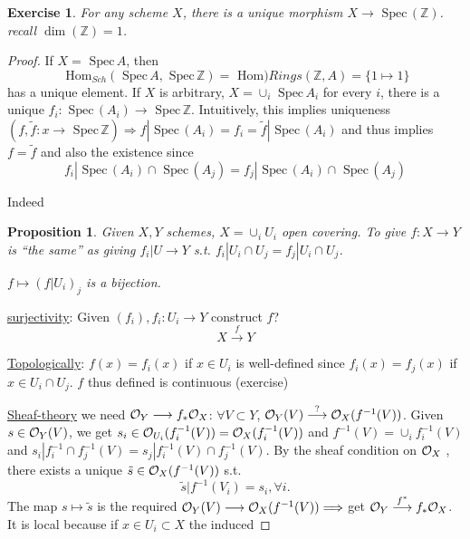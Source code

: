 \documentclass[11pt]{article}
\newtheorem{prop}[thm]{Proposition}
\newtheorem{exercise}[thm]{Exercise}
\renewcommand{\hom}{\text{ Hom}}
\newcommand{\spec}{\text{ Spec}\,}
\newcommand{\intg}{\mathbb Z}
\newcommand{\calo}{{\cal O}}
\newcommand{\Lrta}{\Longrightarrow}
\newcommand{\lrta}{\longrightarrow}
\begin{document}
\begin{exercise}
For any scheme $X$, there is a unique morphism $X\lrta \spec(\intg)$. recall $\dim(\intg)=1$.
\end{exercise}
\begin{proof}
If $X=\spec A$, then
$$
\hom_{Sch}(\spec A,\spec \intg)=\hom){Rings}(\intg, A)=\{1\mapsto 1\}
$$
has a unique element. If $X$ is arbitrary, $X=\cup_{i}\spec A_i$ for every $i$, there is a unique $f_i:\spec (A_i)\lrta \spec \intg$. Intuitively, this implies uniqueness $(f,\tilde{f}:x\lrta \spec \intg)\Lrta f|\spec(A_i)=f_i=\tilde{f}|\spec(A_i)$ and thus implies $f=\tilde{f}$ and also the existence since
$$
f_i|\spec(A_i)\cap \spec(A_j)=f_j|\spec(A_i)\cap \spec(A_j)
$$

Indeed
\begin{prop}
Given $X,Y$ schemes, $X=\cup_i U_i$ open covering. To give $f:X\lrta Y$ is ``the same'' as giving $f_i|U\lrta Y$ s.t. $f_i|U_i\cap U_j=f_j|U_i\cap U_j$.

$f\mapsto (f|U_i)_j$ is a bijection.
\end{prop}
\underline{surjectivity}: Given $(f_i), f_i:U_i\lrta Y$ construct $f$? 
$$
X\overset{f}{\lrta } Y
$$

\underline{Topologically}: $f(x)=f_i(x)$ if $x\in U_i$ is well-defined since $f_i(x)=f_j(x)$ if $x\in U_i\cap U_j$. $f$ thus defined is continuous (exercise)

\underline{Sheaf-theory} we need $\calo_Y\lrta f_*\calo_X$: $\forall V\subset Y$, $\calo_Y(V)\overset{?}{\lrta}\calo_X(f^{-1}(V))$. Given $s\in \calo_Y(V)$, we get $s_i\in \calo_{U_i}(f_i^{-1}(V))=\calo_X(f_i^{-1}(V))$ and $f^{-1}(V)=\cup_i f_i^{-1}(V)$ and 
$s_i|f_i^{-1}\cap f_j^{-1}(V)=s_j|f_i^{-1}(V)\cap f_j^{-1}(V)$. By the sheaf condition on $\calo_X$ , there exists a  unique $\tilde{s}\in \calo_X(f^{-1}(V))$ s.t.
$$
\tilde{s}|f^{-1}(V_i)=s_i,\forall i.
$$
The map $s\mapsto \tilde{s}$ is the required
$\calo_Y(V)\lrta \calo_X(f^{-1}(V))\Lrta $ get $\calo_Y\overset{f^*}{\lrta }f_*\calo_X$. It is local because if $x\in U_i\subset X$ the induced 
\end{proof}
\end{document}
